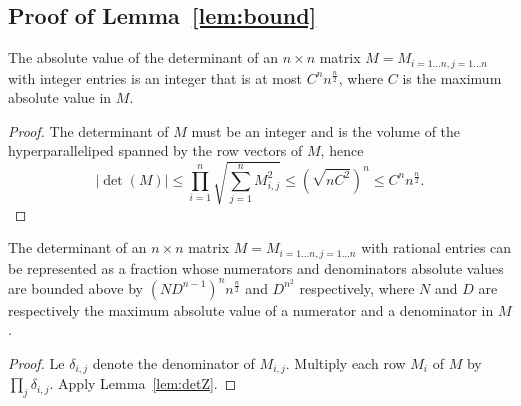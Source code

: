 \subsection{Proof of Lemma~\ref*{lem:bound}}%
\label{app:bound}



\begin{lemma}\label{lem:detZ}
	The absolute value of the determinant of an $n\times n$ matrix $M =
	M_{i=1\ldots n,j=1\ldots n}$ with integer entries is an integer that is at
	most $C^n n^{\frac n2}$, where $C$ is the maximum absolute value in $M$.
\end{lemma}
\begin{proof}
	The determinant of $M$ must be an integer
	and is the volume of the
	hyperparalleliped spanned by the row vectors of $M$, hence
	$$
	|\det(M)| \le \prod_{i=1}^n \sqrt{\sum_{j=1}^{n} M_{i,j}^2} \le {(\sqrt{n C^2})}^{n} \le C^n n^\frac n2.
	$$
\end{proof}

\begin{lemma}\label{lem:detQ}
	The determinant of an $n\times n$ matrix $M = M_{i=1\ldots n,j=1\ldots n}$ with
	rational entries can be represented as a fraction whose numerators and
	denominators absolute values are bounded above by
	${(ND^{n-1})}^n n^{\frac n2}$ and $D^{n^2}$
	respectively, where $N$ and $D$
	are respectively the maximum absolute value of a numerator and a
	denominator in $M$.
\end{lemma}
\begin{proof}
	Le $\delta_{i,j}$ denote the denominator of $M_{i,j}$.
	Multiply each row $M_i$ of $M$ by $\prod_j \delta_{i,j}$.
	Apply Lemma~\ref{lem:detZ}.
\end{proof}

